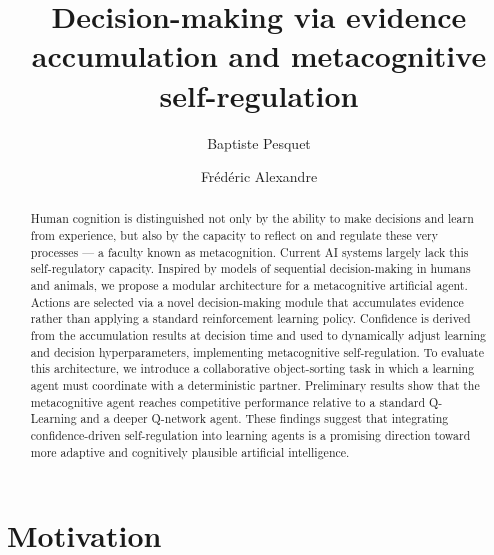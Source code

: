 \documentclass[runningheads]{llncs}
\begin{document}
%
\title{Decision-making via evidence accumulation and metacognitive self-regulation}
%
%
\author{Baptiste Pesquet \and Frédéric Alexandre}
%
%
%
\maketitle              %
%
\begin{abstract}
Human cognition is distinguished not only by the ability to make decisions and learn from experience, but also by the capacity to reflect on and regulate these very processes — a faculty known as metacognition. Current AI systems largely lack this self-regulatory capacity. Inspired by models of sequential decision-making in humans and animals, we propose a modular architecture for a metacognitive artificial agent. Actions are selected via a novel decision-making module that accumulates evidence rather than applying a standard reinforcement learning policy. Confidence is derived from the accumulation results at decision time and used to dynamically adjust learning and decision hyperparameters, implementing metacognitive self-regulation. To evaluate this architecture, we introduce a collaborative object-sorting task in which a learning agent must coordinate with a deterministic partner. Preliminary results show that the metacognitive agent reaches competitive performance relative to a standard Q-Learning and a deeper Q-network agent. These findings suggest that integrating confidence-driven self-regulation into learning agents is a promising direction toward more adaptive and cognitively plausible artificial intelligence.

\end{abstract}
%
%
%
\section{Motivation}
\end{document}
